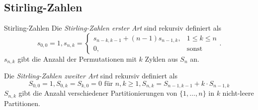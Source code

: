 \documentclass[../../main.tex]{subfiles}
\begin{document}
\subsection{Stirling-Zahlen}
\begin{nutshell}{Stirling-Zahlen}
    Die \emph{Stirling-Zahlen erster Art} sind rekursiv definiert als
    \[s_{0,0}=1, s_{n,k} = \begin{cases}s_{n-k,k-1} + (n-1) s_{n-1,k}, & 1\leq k \leq n\\0,&\text{sonst}\end{cases}.\]
    $s_{n,k}$ gibt die Anzahl der Permutationen mit $k$ Zyklen aus $S_n$ an.
    
    Die \emph{Sitrling-Zahlen zweiter Art} sind rekursiv definiert als
    \[S_{0,0}=1, S_{0,k} = S_{k,0} = 0 \text{ für } n,k \geq 1, S_{n,k} = S_{n-1,k-1}+k\cdot S_{n-1, k}\]
    $S_{n,k}$ gibt die Anzahl verschiedener Partitionierungen von $\{1, \dots, n\}$ in $k$ nicht-leere Partitionen.
\end{nutshell}
\end{document}

